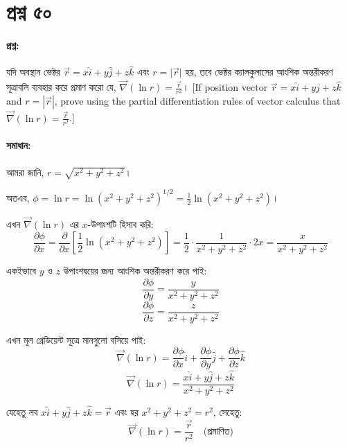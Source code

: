 \documentclass{article}
\begin{document}
\section*{প্রশ্ন ৫০}

\paragraph{প্রশ্ন:} 
যদি অবস্থান ভেক্টর $\vec{r} = x\hat{i} + y\hat{j} + z\hat{k}$ এবং $r = \vert{}\vec{r}\vert{}$ হয়, তবে ভেক্টর ক্যালকুলাসের আংশিক অন্তরীকরণ সূত্রাবলি ব্যবহার করে প্রমাণ করো যে, $\vec{\nabla}(\ln r) = \frac{\vec{r}}{r^2}$। 
[If position vector $\vec{r} = x\hat{i} + y\hat{j} + z\hat{k}$ and $r = |\vec{r}|$, prove using the partial differentiation rules of vector calculus that $\vec{\nabla}(\ln r) = \frac{\vec{r}}{r^2}$.]

\begin{center}
\end{center}

\paragraph{সমাধান:}

আমরা জানি, $r = \sqrt{x^2+y^2+z^2}$।

অতএব, $\phi = \ln r = \ln(x^2+y^2+z^2)^{1/2} = \frac{1}{2}\ln(x^2+y^2+z^2)$।

এখন $\vec{\nabla}(\ln r)$ এর $x$-উপাংশটি হিসাব করি:
$$\frac{\partial \phi}{\partial x} = \frac{\partial}{\partial x}\left[\frac{1}{2}\ln(x^2+y^2+z^2)\right] = \frac{1}{2} \cdot \frac{1}{x^2+y^2+z^2} \cdot 2x = \frac{x}{x^2+y^2+z^2}$$

একইভাবে $y$ ও $z$ উপাংশদ্বয়ের জন্য আংশিক অন্তরীকরণ করে পাই:
$$\frac{\partial \phi}{\partial y} = \frac{y}{x^2+y^2+z^2}$$
$$\frac{\partial \phi}{\partial z} = \frac{z}{x^2+y^2+z^2}$$

এখন মূল গ্রেডিয়েন্ট সূত্রে মানগুলো বসিয়ে পাই:
$$\vec{\nabla}(\ln r) = \frac{\partial \phi}{\partial x}\hat{i} + \frac{\partial \phi}{\partial y}\hat{j} + \frac{\partial \phi}{\partial z}\hat{k}$$
$$\vec{\nabla}(\ln r) = \frac{x\hat{i} + y\hat{j} + z\hat{k}}{x^2+y^2+z^2}$$

যেহেতু লব $x\hat{i} + y\hat{j} + z\hat{k} = \vec{r}$ এবং হর $x^2+y^2+z^2 = r^2$, সেহেতু:
$$\vec{\nabla}(\ln r) = \frac{\vec{r}}{r^2} \quad \text{(প্রমাণিত)}$$
\end{document}

